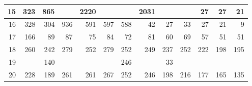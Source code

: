 \begin{table}[]
{\begin{tabular}{r|rr|rrrrrrr|rrr}
    15    & 323   & 865   &       & 2220  &       &       & 2031  &       &       & 27    & 27    & 21 \\ \hline
    16    & 328   & 304   & 936   & 591   & 597   & 588   & 42    & 27    & 33    & 27    & 21    & 9 \\
    17    & 166   & 89    & 87    & 75    & 84    & 72    & 81    & 60    & 69    & 57    & 51    & 51 \\
    18    & 260   & 242   & 279   & 252   & 279   & 252   & 249   & 237   & 252   & 222   & 198   & 195 \\
    19    &       & 140   &       &       &       & 246   &       & 33    &       &       &       &  \\
    20    & 228   & 189   & 261   & 261   & 267   & 252   & 246   & 198   & 216   & 177   & 165   & 135 \\
    \bottomrule
    \end{tabular}%
} \label{tab:temex_rate}
\end{table}


